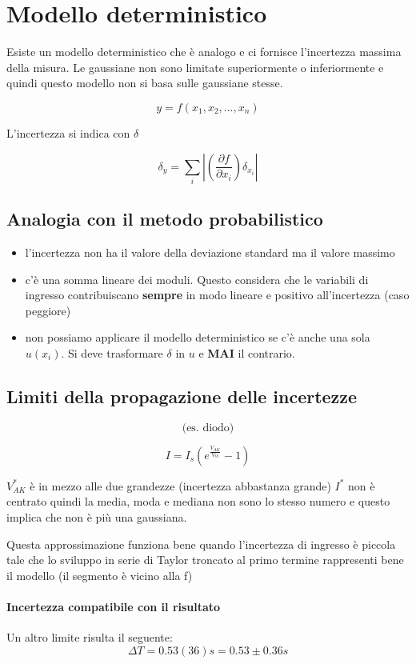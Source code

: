 \section{Modello deterministico}
Esiste un modello deterministico che è analogo e ci fornisce l'incertezza massima della misura. Le gaussiane non sono limitate superiormente o inferiormente e quindi questo modello non si basa sulle gaussiane stesse.

\[
y = f(x_1, x_2, \ldots, x_n)
\]

L'incertezza si indica con $\delta$

\[
\delta_y = \sum_i \left|\left( \frac{\partial f}{\partial x_i} \right) \delta_{x_i} \right|
\]

\subsection{Analogia con il metodo probabilistico}
\begin{itemize}
    \item l'incertezza non ha il valore della deviazione standard ma il valore massimo
    \item c'è una somma lineare dei moduli. Questo considera che le variabili di ingresso contribuiscano \textbf{sempre} in modo lineare e positivo all'incertezza (caso peggiore)
    \item non possiamo applicare il modello deterministico se c'è anche una sola $u(x_i)$. Si deve trasformare $\delta$ in $u$ e \textbf{MAI} il contrario.
\end{itemize}

\subsection{Limiti della propagazione delle incertezze}

\[
\text{(es. diodo)}
\]

\[
I = I_s \left( e^{\frac{V_{AK}}{V_{th}}} - 1 \right)
\]

$V_{AK}^*$ è in mezzo alle due grandezze (incertezza abbastanza grande)  
$I^*$ non è centrato quindi la media, moda e mediana non sono lo stesso numero e questo implica che non è più una gaussiana.

Questa approssimazione funziona bene quando l’incertezza di ingresso è piccola tale che lo sviluppo in serie di Taylor troncato al primo termine rappresenti bene il modello (il segmento è vicino alla f)

\paragraph{Incertezza compatibile con il risultato}  
Un altro limite risulta il seguente:
\[
\Delta T = 0.53(36)s = 0.53 \pm 0.36s
\]

